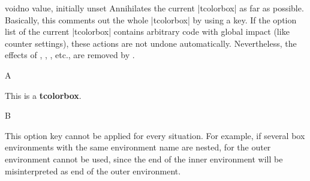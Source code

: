 \clearpage
\begin{docTcbKey}[][doc new=2016-10-21]{void}{}{no value, initially unset}
  Annihilates the current |tcolorbox| as far as possible.
  Basically, this comments out the whole |tcolorbox| by using a key.
  If the option list of the current |tcolorbox| contains arbitrary code with global
  impact (like counter settings), these actions are not undone automatically.
  Nevertheless, the effects of , ,
  , etc., are removed by .

\begin{dispExample}
A%
  \begin{tcolorbox}[
      title=This box is completely removed by the following key,
      void
    ]
  This is a \textbf{tcolorbox}.
  \end{tcolorbox}
B
\end{dispExample}

\begin{marker}
  This option key cannot be applied for every situation.
  For example, if several box environments with the same environment name
  are nested, for the outer environment  cannot be used,
  since the end of the inner environment will be misinterpreted as
  end of the outer environment.
\end{marker}



\end{docTcbKey}
